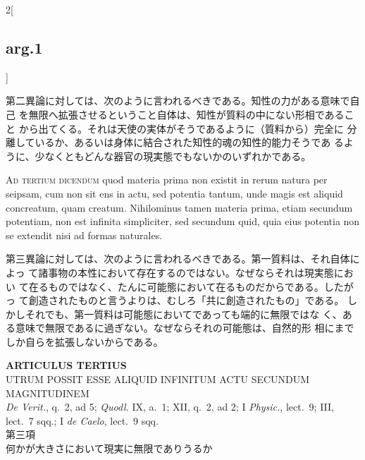 \documentclass[paper=a4paper,fontsize=10pt,jafontsize=9pt,titlepage]{jlreq}
\begin{document}
\begin{paracol}{2}[\subsection{arg.1}]
\switchcolumn

第二異論に対しては、次のように言われるべきである。知性の力がある意味で自己
 を無限へ拡張させるということ自体は、知性が質料の中にない形相であること
 から出てくる。それは天使の実体がそうであるように（質料から）完全に
 分離しているか、あるいは身体に結合された知性的魂の知性的能力そうであ
 るように、少なくともどんな器官の現実態でもないかのいずれかである。

\switchcolumn*[\subsection{ad.3}]

{\scshape Ad tertium dicendum} quod materia prima non existit in rerum natura per
seipsam, cum non sit ens in actu, sed potentia tantum, unde magis est
aliquid concreatum, quam creatum. Nihilominus tamen materia prima, etiam
secundum potentiam, non est infinita simpliciter, sed secundum quid,
quia eius potentia non se extendit nisi ad formas naturales.

\switchcolumn

第三異論に対しては、次のように言われるべきである。第一質料は、それ自体によっ
 て諸事物の本性において存在するのではない。なぜならそれは現実態におい
 て在るものではなく、たんに可能態において在るものだからである。したがっ
 て創造されたものと言うよりは、むしろ「共に創造されたもの」である。
 しかしそれでも、第一質料は可能態においてであっても端的に無限ではな
 く、ある意味で無限であるに過ぎない。なぜならそれの可能態は、自然的形
 相にまでしか自らを拡張しないからである。

\end{paracol}
\newpage
{}

\begin{center}
 {\Large {\bfseries ARTICULUS TERTIUS}}\\
 {\large UTRUM POSSIT ESSE ALIQUID INFINITUM ACTU SECUNDUM MAGNITUDINEM}\\
 {\footnotesize {\itshape De Verit.}, q.~2, ad 5; {\itshape Quodl.} IX,
 a.~1; XII, q.~2, ad 2; I {\itshape Physic.}, lect.~9; III, lect.~7
 sqq.; I {\itshape de Caelo}, lect.~9 sqq.}\\
 {\Large 第三項\\何かが大きさにおいて現実に無限でありうるか}
\end{center}

{}
\setcounter{section}{3}
\setcounter{subsection}{0}
\end{document}

